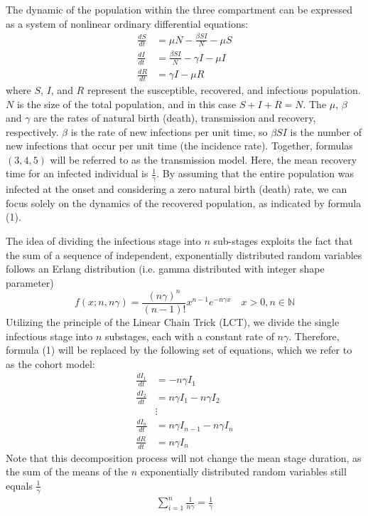 \documentclass[12pt]{article}
\begin{document}
The dynamic of the population within the three compartment can be expressed as a system of nonlinear ordinary differential equations:
\begin{align}
    \frac{dS}{dt} &= \mu N - \frac{\beta SI}{N} - \mu S \\
    \frac{dI}{dt} &= \frac{\beta SI}{N} - \gamma I - \mu I \\
    \frac{dR}{dt} &= \gamma I - \mu R
\end{align}
where $S$, $I$, and $R$ represent the susceptible, recovered, and infectious population. $N$ is the size of the total population, and in this case $S + I + R = N$. The $\mu$, $\beta$ and $\gamma$ are the rates of natural birth (death), transmission and recovery, respectively. $\beta$ is the rate of new infections per unit time, so $\beta SI$ is the number of new infections that occur per unit time (the incidence rate). Together, formulas $(3,4,5)$ will be referred to as the transmission model. Here, the mean recovery time for an infected individual is $\frac{1}{\gamma}$. By assuming that the entire population was infected at the onset and considering a zero natural birth (death) rate, we can focus solely on the dynamics of the recovered population, as indicated by formula (1). 

The idea of dividing the infectious stage into $n$ sub-stages exploits the fact that the sum of a sequence of independent, exponentially distributed random variables follows an Erlang distribution (i.e. gamma distributed with integer shape parameter) \cite{therrien2018probability}
\begin{equation}
    f(x; n,n\gamma) = \frac{(n\gamma)^n}{(n-1)!} x^{n-1} e^{-n\gamma x} \quad x>0, n \in \mathbb{N}
\end{equation}
Utilizing the principle of the Linear Chain Trick (LCT), we divide the single infectious stage into $n$ substages, each with a constant rate of $n\gamma$. Therefore, formula (1) will be replaced by the following set of equations, which we refer to as the cohort model:
\begin{align}
    \frac{dI_1}{dt} &= - n \gamma I_1 \\
    \frac{dI_2}{dt} &= n\gamma I_1 - n \gamma I_2 \\
    &\vdots \\
    \frac{dI_n}{dt} &= n\gamma I_{n-1} - n \gamma I_n \\
    \frac{dR}{dt} &= n \gamma I_n
\end{align}
Note that this decomposition process will not change the mean stage duration, as the sum of the means of the $n$ exponentially distributed random variables still equals $\frac{1}{\gamma}$
\begin{align*}
    \sum_{i=1}^{n} \frac{1}{n\gamma} = \frac{1}{\gamma}
\end{align*}
\end{document}
